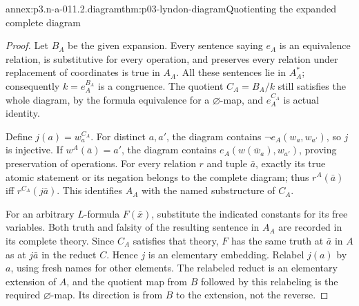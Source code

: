 \begin{annexitem}{annex:p3.n-a-011.2.diagram}{thm:p03-lyndon-diagram}{Quotienting the expanded complete diagram}
\begin{proof}
Let \(B_A\) be the given expansion. Every sentence saying \(e_A\) is
an equivalence relation, is substitutive for every operation, and preserves
every relation under replacement of coordinates is true in \(A_A\).
All these sentences lie in \(A_A^*\); consequently \(k=e_A^{B_A}\)
is a congruence. The quotient \(C_A=B_A/k\) still satisfies the whole
diagram, by the formula equivalence for a \(\varnothing\)-map, and
\(e_A^{C_A}\) is actual identity.

Define \(j(a)=w_a^{C_A}\). For distinct \(a,a'\), the diagram contains
\(\neg e_A(w_a,w_{a'})\), so \(j\) is injective. If
\(w^A(\bar a)=a'\), the diagram contains
\(e_A(w(\bar w_a),w_{a'})\), proving preservation of operations.
For every relation \(r\) and tuple \(\bar a\), exactly its true
atomic statement or its negation belongs to the complete diagram; thus
\(r^A(\bar a)\) iff \(r^{C_A}(j\bar a)\). This identifies \(A_A\)
with the named substructure of \(C_A\).

For an arbitrary \(L\)-formula \(F(\bar x)\), substitute the indicated
constants for its free variables. Both truth and falsity of the resulting
sentence in \(A_A\) are recorded in its complete theory. Since \(C_A\)
satisfies that theory, \(F\) has the same truth at \(\bar a\) in
\(A\) as at \(j\bar a\) in the reduct \(C\). Hence \(j\) is an
elementary embedding. Relabel \(j(a)\) by \(a\), using fresh names
for other elements. The relabeled reduct is an elementary extension of
\(A\), and the quotient map from \(B\) followed by this relabeling
is the required \(\varnothing\)-map. Its direction is from \(B\)
to the extension, not the reverse.
\end{proof}
\end{annexitem}

